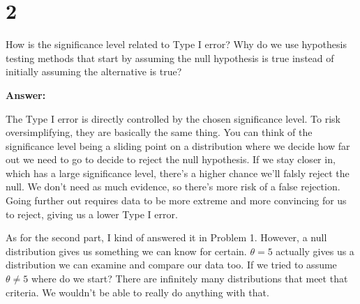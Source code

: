 \section{2}

How is the significance level related to Type I error? Why do we use hypothesis testing methods that start by assuming the null hypothesis is true instead of initially assuming the alternative is true?

\noindent\textbf{Answer:} 

The Type I error is directly controlled by the chosen significance level. To risk oversimplifying, they are basically the same thing. You can think of the significance level being a sliding point on a distribution where we decide how far out we need to go to decide to reject the null hypothesis. If we stay closer in, which has a large significance level, there's a higher chance we'll falsly reject the null. We don't need as much evidence, so there's more risk of a false rejection. Going further out requires data to be more extreme and more convincing for us to reject, giving us a lower Type I error.

As for the second part, I kind of answered it in Problem 1. However, a null distribution gives us something we can know for certain. $\theta = 5$ actually gives us a distribution we can examine and compare our data too. If we tried to assume $\theta \neq 5$ where do we start? There are infinitely many distributions that meet that criteria. We wouldn't be able to really do anything with that.